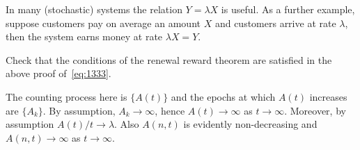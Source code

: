 In many (stochastic) systems the relation $Y=\lambda X$ is useful. As
a further example, suppose customers pay on average an amount $X$ and
customers arrive at rate $\lambda$, then the system earns money at
rate $\lambda X = Y$. 

\begin{question} 
Check that the conditions of the renewal reward theorem are satisfied in the above proof of~\eqref{eq:1333}. 
  \begin{solution}
    The counting process here is $\{A(t)\}$ and the epochs at which
    $A(t)$ increases are $\{A_k\}$. By assumption, $A_k\to\infty$,
    hence $A(t)\to\infty$ as $t\to\infty$. Moreover, by assumption
    $A(t)/t \to \lambda$. Also $A(n,t)$ is evidently non-decreasing and
    $A(n,t)\to\infty$ as $t\to\infty$.
  \end{solution}
\end{question}

